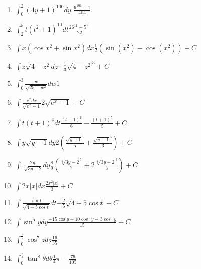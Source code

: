 {\small
\begin{enumerate}


\item {$\displaystyle\int_{0}^{2}\left( 4y+1\right) ^{100}dy$}{ $\frac{9^{101}-1}{404}.$}

\item {$\displaystyle\int_{2}^{5}t(t^{2}+1)^{10}dt$}{$\frac{26^{11}-5^{11}}{22}$}

\item {$\displaystyle\int x\left( \cos x^{2}+\sin x^{2}\right) dx$}{$\frac{1}{2}\left( \sin \left( x^{2}\right) -\cos \left( x^{2}\right) \right) +C$}

\item {$\displaystyle\int z\sqrt{4-z^{2}}dz$}{$-\frac{1}{3}\sqrt{4-z^{2}}^{3}+C$}

\item {$\displaystyle\int_{0}^{3}\frac{w}{\sqrt{25-w^{2}}}dw$}{$1$}

\item {$\displaystyle\int \frac{e^{x}dx}{\sqrt{e^{x}-1}}$}{$2\sqrt{e^{x}-1}+C$}

\item {$\displaystyle\int t(t+1)^{4}dt$}{$ \frac{\left( t+1\right) ^{6}}{6}-\frac{\left( t+1\right) ^{5}}{5}+C$}

\item {$\displaystyle\int y\sqrt{y-1}dy$}{$2\left( \frac{\sqrt{y-1}^{5}}{5}+\frac{\sqrt{y-1}^{3}}{3}\right) +C$}

\item {$\displaystyle\int \frac{2y}{\sqrt[4]{3y-2}}dy$}{$\frac{8}{9}\left(\frac{\sqrt[4]{3y-2}^{7}}{7}+2\frac{\sqrt[4]{3y-2}^{3}}{3}\right) +C$}

\item {$\displaystyle\int 2x\left\vert x\right\vert dx$}{$\frac{2x^{2}\left\vert x\right\vert }{3}+C$}

\item {$\displaystyle\int \frac{\sin t}{\sqrt{4+5\cos t}}dt$}{$ -\frac{2}{5}\sqrt{4+5\cos t}+C$}

\item {$\displaystyle\int \sin ^{5}ydy$}{$\frac{-15\cos y+10\cos ^{3}y-3\cos ^{5}y}{15}+C$}

\item {$\displaystyle\int_{0}^{\frac{\pi }{2}}\cos ^{7}zdz$}{$\frac{16}{35}$}

\item {$\displaystyle\int_{0}^{\frac{\pi }{4}}\tan ^{8}\theta d\theta$}{$\frac{1}{4}\pi -\frac{76}{105}$}


\end{enumerate}}
